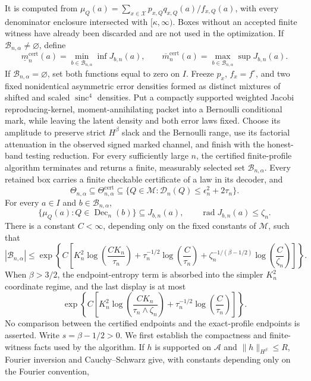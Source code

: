 It is computed from \(\mu_Q(a)=\sum_{x\in\mathcal X}p_{x,Q}q_{x,Q}(a)/f_{x,Q}(a)\), with every denominator enclosure intersected with \([\kappa,\infty)\).  Boxes without an accepted finite witness have already been discarded and are not used in the optimization.  If \(\mathscr B_{n,\alpha}\neq\varnothing\), define
\[
 \underline m^{\mathrm{cert}}_n(a)
 =\min_{b\in\mathscr B_{n,\alpha}}\inf J_{b,n}(a),
 \qquad
 \overline m^{\mathrm{cert}}_n(a)
 =\max_{b\in\mathscr B_{n,\alpha}}\sup J_{b,n}(a).
\]
If \(\mathscr B_{n,\alpha}=\varnothing\), set both functions equal to zero on \(I\).
Freeze \(p_x\), \(f_x=f^{\circ}\), and two fixed nonidentical asymmetric error densities formed as distinct mixtures of shifted and scaled \(\operatorname{sinc}^4\) densities.  Put a compactly supported weighted Jacobi reproducing-kernel, moment-annihilating packet into a Bernoulli conditional mark, while leaving the latent density and both error laws fixed.  Choose its amplitude to preserve strict \(H^\beta\) slack and the Bernoulli range, use its factorial attenuation in the observed signed marked channel, and finish with the honest-band testing reduction.
For every sufficiently large \(n\), the certified finite-profile algorithm terminates and returns a finite, measurably selected set \(\mathscr B_{n,\alpha}\).  Every retained box carries a finite checkable certificate of a law in its decoder, and
\[
 \Theta_{n,\alpha}
 \subseteq\Theta^{\mathrm{cert}}_{n,\alpha}
 \subseteq
 \{Q\in\mathcal M:\mathscr D_n(Q)\le\epsilon_n^2+2\tau_n\}.
\]
For every \(a\in I\) and \(b\in\mathscr B_{n,
\alpha}\),
\[
 \{\mu_Q(a):Q\in\operatorname{Dec}_n(b)\}
 \subseteq J_{b,n}(a),
 \qquad \operatorname{rad}J_{b,n}(a)\le\zeta_n.
\]
There is a constant \(C<\infty\), depending only on the fixed constants of \(\mathcal M\), such that
\[
 |\mathscr B_{n,\alpha}|
 \le
 \exp\!\left\{C\left[
 K_n^2\log\!\left(\frac{C K_n}{\tau_n}\right)
 +\tau_n^{-1/2}\log\!\left(\frac C{\tau_n}\right)
 +\zeta_n^{-1/(\beta-1/2)}
   \log\!\left(\frac C{\zeta_n}\right)
 \right]\right\}.
\]
When \(\beta>3/2\), the endpoint-entropy term is absorbed into the simpler \(K_n^2\) coordinate regime, and the last display is at most
\[
 \exp\!\left\{C\left[
 K_n^2\log\!\left(\frac{C K_n}{\tau_n\wedge\zeta_n}\right)
 +\tau_n^{-1/2}\log\!\left(\frac C{\tau_n}\right)
 \right]\right\}.
\]
No comparison between the certified endpoints and the exact-profile endpoints is asserted.
Write \(s=\beta-1/2>0\).  We first establish the compactness and finite-witness facts used by the algorithm.  If \(h\) is supported on \(\mathcal A\) and \(\|h\|_{H^\beta}\le R\), Fourier inversion and Cauchy--Schwarz give, with constants depending only on the Fourier convention,
